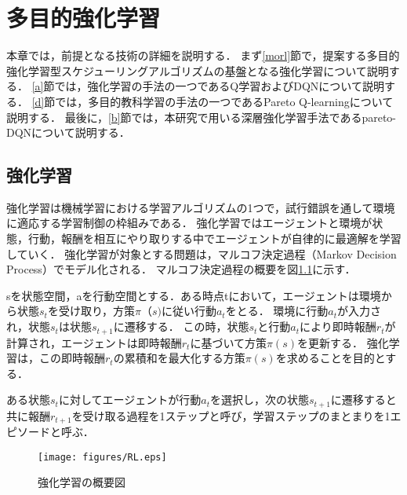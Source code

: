 \documentclass[12pt,oneside]{ise-thesis} %
\begin{document}
\chapter{多目的強化学習}


本章では，前提となる技術の詳細を説明する．
まず\ref{morl}節で，提案する多目的強化学習型スケジューリングアルゴリズムの基盤となる強化学習について説明する．
\ref{a}節では，強化学習の手法の一つであるQ学習およびDQNについて説明する．
\ref{d}節では，多目的教科学習の手法の一つであるPareto Q-learningについて説明する． 
最後に，\ref{b}節では，本研究で用いる深層強化学習手法であるpareto-DQNについて説明する．

\section{強化学習}
強化学習は機械学習における学習アルゴリズムの1つで，試行錯誤を通して環境に適応する学習制御の枠組みである．
強化学習ではエージェントと環境が状態，行動，報酬を相互にやり取りする中でエージェントが自律的に最適解を学習していく．
強化学習が対象とする問題は，マルコフ決定過程（Markov Decision Process）でモデル化される．
マルコフ決定過程の概要を図\ref{markov}に示す．

sを状態空間，aを行動空間とする．ある時点tにおいて，エージェントは環境から状態$s_t$を受け取り，方策$\pi（s)$に従い行動$a_t$をとる．
環境に行動$a_t$が入力され，状態$s_t$は状態$s_{t+1}$に遷移する．
この時，状態$s_t$と行動$a_t$により即時報酬$r_t$が計算され，エージェントは即時報酬$r_t$に基づいて方策$\pi(s)$を更新する．
強化学習は，この即時報酬$r_t$の累積和を最大化する方策$\pi(s)$を求めることを目的とする．

ある状態$s_t$に対してエージェントが行動$a_t$を選択し，次の状態$s_{t+1}$に遷移すると共に報酬$r_{t+1}$を受け取る過程を1ステップと呼び，学習ステップのまとまりを1エピソードと呼ぶ．

\begin{figure}[t]
 \hspace*{\fill}
 \label{markov}
 \texttt{[image: figures/RL.eps]}
 \hspace*{\fill}
 \caption{強化学習の概要図}
\end{figure}
\end{document}
